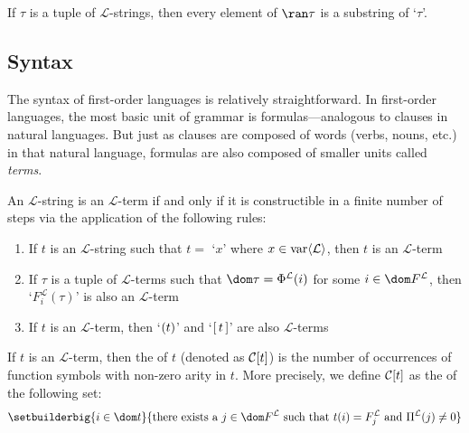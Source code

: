 \begin{thm}
     \label{thm:first-order-language-each-L-string-in-a-tuple-of-L-strings-is-a-substring-of-the-expanded-tuple}
    If \( \tau \) is a tuple of \( \mathcal{L} \)-strings, then every element of \( \ran \tau \) is a substring of `\( \tau \)'.
\end{thm}

\subsection{Syntax}
The syntax of first-order languages is relatively straightforward.
In first-order languages, the most basic unit of grammar is formulas---analogous to
clauses in natural languages. But just as clauses are composed of words (verbs, nouns, etc.) in that natural language,
formulas are also composed of smaller units called \emph{terms}.

\begin{dfn}[Terms]
     \label{dfn:first-order-language-construction-of-terms}
    An \( \mathcal{L} \)-string is an \( \mathcal{L} \)-term if and only if
    it is constructible in a finite number of steps via the application of the following rules:
    \begin{enumerate}[topsep=2pt,label=\textup{\texttt{(\alph*)}}]
        \item If \( t \) is an \( \mathcal{L} \)-string such that \( t = \) `\( x \)' where \( x \in \operatorname{var} \langle\mathcal{L}\rangle \),
             then \( t \) is an \( \mathcal{L} \)-term
        \item If \( \tau \) is a tuple of \( \mathcal{L} \)-terms such that \( \dom \tau = \Phi^{\mathcal{L}}(i) \) for some \( i \in \dom F^{\mathcal{L}} \),
             then `\( F^{\mathcal{L}}_{i}(\tau) \)' is also an \( \mathcal{L} \)-term
        \item If \( t \) is an \( \mathcal{L} \)-term, then `\( \mleft( t \mright) \)' and `\( \mleft[ \, t \, \mright] \)' are
             also \( \mathcal{L} \)-terms
    \end{enumerate}
\end{dfn}

\begin{dfn}[Complexity]
     \label{dfn:first-order-language-complexity-of-terms}
    If \( t \) is an \( \mathcal{L} \)-term, then the  of \( t \) (denoted as \( \folcomplexityofterm{t} \))
    is the number of occurrences of function symbols with non-zero arity in \( t \).
    More precisely, we define \( \folcomplexityofterm{t} \) as the  of the following set:
    \begin{equation*}
        \setbuilderbig{i \in \dom t}{ \text{there exists a \( j \in \dom F^{\mathcal{L}} \) such that } t(i) = F^{\mathcal{L}}_{j} \ \text{and} \ \Pi^{\mathcal{L}}(j) \neq 0 }
    \end{equation*}
\end{dfn}

